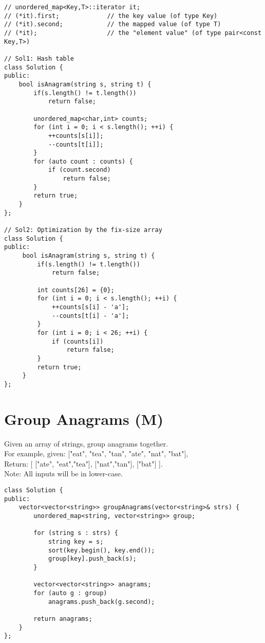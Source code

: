 \begin{lstlisting}
// unordered_map<Key,T>::iterator it;
// (*it).first;             // the key value (of type Key)
// (*it).second;            // the mapped value (of type T)
// (*it);                   // the "element value" (of type pair<const Key,T>)

// Sol1: Hash table
class Solution {
public:
    bool isAnagram(string s, string t) {
        if(s.length() != t.length())
            return false;
            
        unordered_map<char,int> counts;
        for (int i = 0; i < s.length(); ++i) {
            ++counts[s[i]];
            --counts[t[i]];
        }
        for (auto count : counts) {
            if (count.second)
                return false;
        }
        return true;
    }
};

// Sol2: Optimization by the fix-size array
class Solution {
public:
     bool isAnagram(string s, string t) {
         if(s.length() != t.length())
             return false;
            
         int counts[26] = {0};
         for (int i = 0; i < s.length(); ++i) {
             ++counts[s[i] - 'a'];
             --counts[t[i] - 'a'];
         }
         for (int i = 0; i < 26; ++i) {
             if (counts[i])
                 return false;
         }
         return true;
     }
};
\end{lstlisting}


\section{Group Anagrams (M)}
Given an array of strings, group anagrams together.\\

For example, given: ["eat", "tea", "tan", "ate", "nat", "bat"],\\
Return:
[
  ["ate", "eat","tea"],
  ["nat","tan"],
  ["bat"]
].\\

Note: All inputs will be in lower-case.\\

\begin{lstlisting}
class Solution {
public:
    vector<vector<string>> groupAnagrams(vector<string>& strs) {
        unordered_map<string, vector<string>> group;

        for (string s : strs) {
            string key = s; 
            sort(key.begin(), key.end());
            group[key].push_back(s);
        }
        
        vector<vector<string>> anagrams;
        for (auto g : group)
            anagrams.push_back(g.second);
        
        return anagrams;
    }
};
\end{lstlisting}


